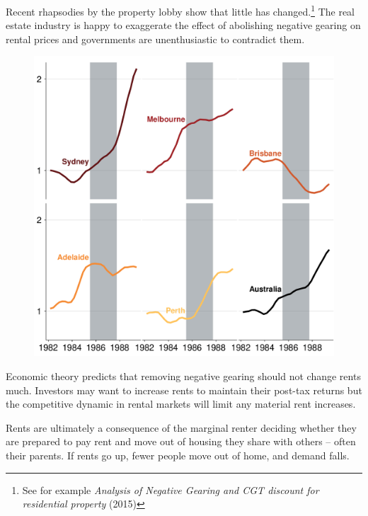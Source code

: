 \documentclass{grattan}\usepackage[]{graphicx}\usepackage[]{color}
\begin{document}
Recent rhapsodies by the property lobby show that little has changed.\footnote{See for example \emph{Analysis of Negative Gearing and CGT discount for residential property} (2015)}  The real estate industry is happy to exaggerate the effect of abolishing negative gearing on rental prices and governments are unenthusiastic to contradict them. 


\begin{figure}
\includegraphics[width=\columnwidth]{figure/Capital_city_rents-1}
\end{figure}
Economic theory predicts that removing negative gearing should not change rents much. Investors may want to increase rents to maintain their post-tax returns but the competitive dynamic in rental markets will limit any material rent increases. 

Rents are ultimately a consequence of the marginal renter deciding whether they are prepared to pay rent and move out of housing they share with others -- often their parents. If rents go up, fewer people move out of home, and demand falls. 
\end{document}
